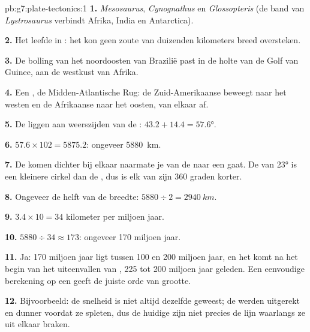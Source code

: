 \begin{solution}{pb:g7:plate-tectonics:1}
\textbf{1.} \emph{Mesosaurus}, \emph{Cynognathus} en \emph{Glossopteris}
(de band van \emph{Lystrosaurus} verbindt Afrika, India en Antarctica).

\textbf{2.} Het leefde in : het kon geen zoute  van
duizenden kilometers breed oversteken.

\textbf{3.} De bolling van het noordoosten van Brazilië past in de holte
van de Golf van Guinee, aan de westkust van Afrika.

\textbf{4.} Een , de Midden-Atlantische Rug: de
Zuid-Amerikaanse  beweegt naar het westen en de Afrikaanse  naar
het oosten, van elkaar af.

\textbf{5.} De  liggen aan weerszijden van de :
$43.2 + 14.4 = \ang{57.6}$.

\textbf{6.} $57.6 \times 102 = 5875.2$: ongeveer \qty{5880}{km}.

\textbf{7.} De  komen dichter bij elkaar naarmate je van de
 naar een  gaat. De  van \ang{23}  is
een kleinere cirkel dan de , dus is elk van zijn 360 graden korter.

\textbf{8.} Ongeveer de helft van de breedte: $5880 \div 2 = \qty{2940}{km}$.

\textbf{9.} $3.4 \times 10 = 34$ kilometer per miljoen jaar.

\textbf{10.} $5880 \div 34 \approx 173$: ongeveer 170 miljoen jaar.

\textbf{11.} Ja: 170 miljoen jaar ligt tussen 100 en 200 miljoen jaar, en
het komt na het begin van het uiteenvallen van , 225 tot 200 miljoen
jaar geleden. Een eenvoudige berekening op een  geeft de juiste orde
van grootte.

\textbf{12.} Bijvoorbeeld: de snelheid is niet altijd dezelfde geweest; de
 werden uitgerekt en dunner voordat ze spleten, dus de huidige
 zijn niet precies de lijn waarlangs ze uit elkaar braken.
\end{solution}
